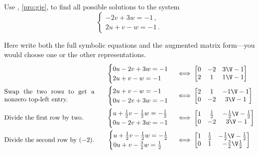 \begin{example} \label{eg:gjeb}
Use , \cref{pro:gje}, to find all possible solutions to the  system
\begin{equation*}
\begin{cases}
-2v+3w=-1\,,\\2u+v-w=-1\,.
\end{cases}
\end{equation*}

\begin{solution} 
Here write both the full symbolic equations and the augmented matrix form---you would choose one or the other representations.
\begin{align*}&&
\begin{cases}
0u-2v+3w=-1\\2u+v-w=-1
\end{cases}
&\iff
\begin{bmatrix} 0&-2&3\V-1\\2&1&1\V-1 \end{bmatrix}
\\&
\parbox{0.4\linewidth}{Swap the two rows to get a nonzero top-left entry.}
\quad&
\begin{cases}
2u+v-w=-1\\0u-2v+3w=-1
\end{cases}
&\iff
\begin{bmatrix} 2&1&-1\V-1\\0&-2&3\V-1 \end{bmatrix}
\\&
\parbox{0.4\linewidth}{Divide the first row by two.}
\quad&
\begin{cases}
u+\frac12v-\frac12w=-\frac12\\0u-2v+3w=-1
\end{cases}
&\iff
\begin{bmatrix} 1&\frac12&-\frac12\V-\frac12\\0&-2&3\V-1 \end{bmatrix}
\\&
\parbox{0.4\linewidth}{Divide the second row by~\((-2)\).}
\quad&
\begin{cases}
u+\frac12v-\frac12w=-\frac12\\0u+v-\frac32w=\frac12
\end{cases}
&\iff
\begin{bmatrix} 1&\frac12&-\frac12\V-\frac12\\0&1&-\frac32\V\frac12 \end{bmatrix}
\\&

\end{align*}
\end{solution}
\end{example}
